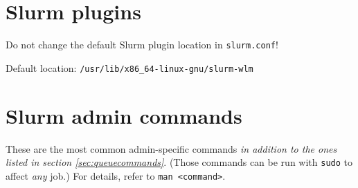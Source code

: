 %
%
%
%
%
%

\section{Slurm plugins} \label{sec:slurmplugins}

Do not change the default Slurm plugin location in \texttt{slurm.conf}!

Default location: \texttt{/usr/lib/x86\_64-linux-gnu/slurm-wlm}

\section{Slurm admin commands} \label{sec:slurmadmin}
These are the most common admin-specific commands \emph{in addition to the ones listed in section \ref{sec:queuecommands}}. (Those commands can be run with \texttt{sudo} to affect \emph{any} job.) For details, refer to \texttt{man <command>}.

